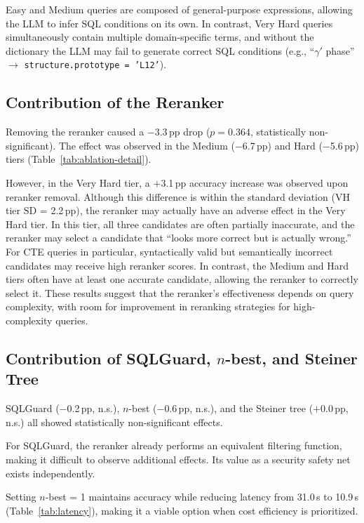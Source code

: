 \documentclass{npj-compt.mater}
\begin{document}
Easy and Medium queries are composed of general-purpose
expressions, allowing the LLM to infer SQL conditions on its own.
In contrast, Very Hard queries simultaneously contain multiple
domain-specific terms, and without the dictionary the LLM may
fail to generate correct SQL conditions (e.g.,
``$\gamma'$ phase'' $\to$
\texttt{structure.prototype = 'L12'}).

\subsection{Contribution of the Reranker}
\label{sec:reranker_discussion}

Removing the reranker caused a $-$3.3\,pp drop ($p=0.364$,
statistically non-significant).
The effect was observed in the Medium ($-$6.7\,pp) and Hard
($-$5.6\,pp) tiers (Table~\ref{tab:ablation-detail}).

However, in the Very Hard tier, a $+$3.1\,pp accuracy increase
was observed upon reranker removal.
Although this difference is within the standard deviation
(VH tier SD = 2.2\,pp), the reranker may actually have an
adverse effect in the Very Hard tier.
In this tier, all three candidates are often partially inaccurate,
and the reranker may select a candidate that ``looks more correct
but is actually wrong.''
For CTE queries in particular, syntactically valid but
semantically incorrect candidates may receive high reranker scores.
In contrast, the Medium and Hard tiers often have at least one
accurate candidate, allowing the reranker to correctly select it.
These results suggest that the reranker's effectiveness depends
on query complexity, with room for improvement in reranking
strategies for high-complexity queries.

\subsection{Contribution of SQLGuard, $n$-best, and Steiner Tree}

SQLGuard ($-$0.2\,pp, n.s.), $n$-best ($-$0.6\,pp, n.s.), and
the Steiner tree ($+$0.0\,pp, n.s.) all showed statistically
non-significant effects.

For SQLGuard, the reranker already performs an equivalent
filtering function, making it difficult to observe additional
effects. Its value as a security safety net exists independently.

Setting $n$-best = 1 maintains accuracy while reducing latency
from 31.0\,s to 10.9\,s (Table~\ref{tab:latency}), making it
a viable option when cost efficiency is prioritized.
\end{document}
